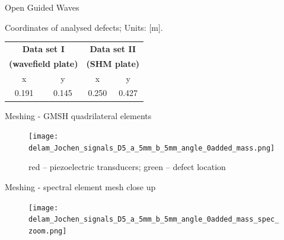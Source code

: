 \documentclass[10pt]{beamer} %
\begin{document}
\begin{frame}{Open Guided Waves}

	\begin{table}
		\renewcommand{\arraystretch}{1.3}
		\centering \small
		Coordinates of analysed defects; Units: [m].
		
		\begin{tabular}{cccc} 
			\toprule
			\multicolumn{2}{c}{\textbf{Data set I} }	& \multicolumn{2}{c}{\textbf{Data set II} } \\
			\multicolumn{2}{c}{\textbf{(wavefield plate)} }	& \multicolumn{2}{c}{\textbf{(SHM plate)} } \\
			\cmidrule(lr){1-2} \cmidrule(lr){3-4}
			x & y &  x &  y  \\
			0.191 & 0.145 & 0.250  & 0.427 \\ 
			\bottomrule 
		\end{tabular} 
		\label{tab:defect_coordinates}
	\end{table}		
\end{frame}
\begin{frame}[b]{Meshing - GMSH quadrilateral elements}
	\begin{figure}
		\centering
		\texttt{[image: delam\_Jochen\_signals\_D5\_a\_5mm\_b\_5mm\_angle\_0added\_mass.png]}		
		\caption{red -- piezoelectric transducers; green -- defect location}
		\label{fig:quad_mesh}
	\end{figure}	
\end{frame}
\begin{frame}[t]{Meshing - spectral element mesh close up}
	\begin{figure}
		\centering
		\texttt{[image: delam\_Jochen\_signals\_D5\_a\_5mm\_b\_5mm\_angle\_0added\_mass\_spec\_zoom.png]}	
		\label{fig:spec_mesh_zoom}
	\end{figure}	
\end{frame}
\end{document}
